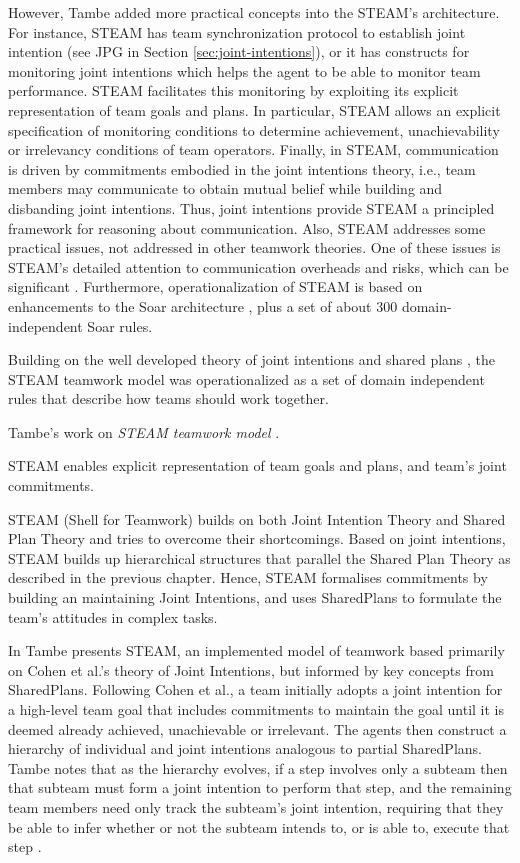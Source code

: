 \documentclass[11pt]{article}
\begin{document}
However, Tambe added more practical concepts into the
STEAM's architecture. For instance, STEAM has team synchronization protocol to establish joint intention (see JPG in Section
\ref{sec:joint-intentions}), or it has constructs for monitoring joint
intentions which helps the agent to be able to monitor team performance. STEAM
facilitates this monitoring by exploiting its explicit representation of team
goals and plans. In particular, STEAM allows an explicit specification of
monitoring conditions to determine achievement, unachievability or irrelevancy
conditions of team operators. Finally, in STEAM, communication is driven by
commitments embodied in the joint intentions theory, i.e., team members may
communicate to obtain mutual belief while building and disbanding joint
intentions. Thus, joint intentions provide STEAM a principled framework for
reasoning about communication. Also, STEAM addresses some practical issues, not
addressed in other teamwork theories. One of these issues is STEAM's detailed
attention to communication overheads and risks, which can be significant
\cite{tambe:agent-archtecture-teamwork}. Furthermore, operationalization of
STEAM is based on enhancements to the Soar architecture \cite{laird:soar}, plus
a set of about 300 domain-independent Soar rules.

Building on the well developed theory of joint intentions \cite{cohen:teamwork}
and shared plans \cite{grosz:plans-discourse} \cite{grosz:collaboration}, the
STEAM teamwork model \cite{tambe:flexible-teamwork} was operationalized as a set
of domain independent rules that describe how teams should work together.

Tambe's work on \textit{STEAM teamwork model} \cite{tambe:flexible-teamwork}.

STEAM enables explicit representation of team goals and plans, and team’s
joint commitments.

STEAM (Shell for Teamwork) builds on both Joint Intention Theory and Shared Plan
Theory and tries to overcome their shortcomings. Based on joint intentions,
STEAM builds up hierarchical structures that parallel the Shared Plan Theory as
described in the previous chapter. Hence, STEAM formalises commitments by
building an  maintaining Joint Intentions, and uses SharedPlans to formulate the
team's attitudes in complex tasks.

In \cite{tambe:flexible-teamwork} Tambe presents STEAM, an implemented model of
teamwork based primarily on Cohen et al.'s theory of Joint Intentions, but
informed by key concepts from SharedPlans. Following Cohen et al., a team
initially adopts a joint intention for a high-level team goal that includes
commitments to maintain the goal until it is deemed already achieved,
unachievable or irrelevant. The agents then construct a hierarchy of individual
and joint intentions analogous to partial SharedPlans. Tambe notes that as the
hierarchy evolves, if a step involves only a subteam then that subteam must form
a joint intention to perform that step, and the remaining team members need only
track the subteam's joint intention, requiring that they be able to infer
whether or not the subteam intends to, or is able to, execute that step
\cite{hunsberger:shared-plans-easier}.
\end{document}
